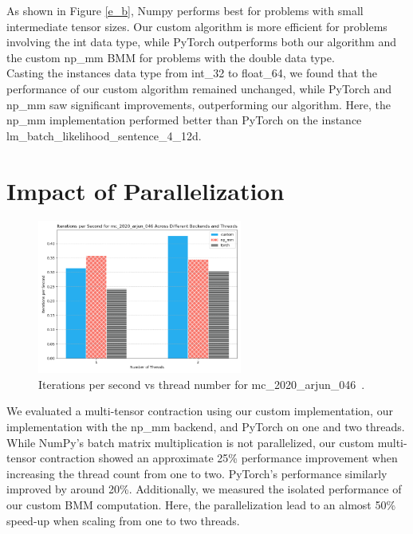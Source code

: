 \sloppy
\noindent As shown in Figure \ref{e_b}, Numpy performs best for problems with small intermediate tensor sizes. Our custom algorithm is more efficient for problems involving the int data type, while PyTorch outperforms both our algorithm and the custom np\_mm BMM for problems with the double data type.\\
Casting the instances data type from int\_32 to float\_64, we found that the performance of our custom algorithm remained unchanged, while PyTorch and np\_mm saw significant improvements, outperforming our algorithm. Here, the np\_mm implementation performed better than PyTorch on the instance lm\_batch\_likelihood\_sentence\_4\_12d.


\section{Impact of Parallelization}
\begin{figure}[H]
    \centering
    \includegraphics[width=0.6\textwidth]{images/threads.png}  %
    \caption{Iterations per second vs thread number for mc\_2020\_arjun\_046~\cite{blacher2024einsum}.}
    \label{threads}
\end{figure}
\noindent We evaluated a multi-tensor contraction using our custom implementation, our implementation with the np\_mm backend, and PyTorch on one and two threads. While NumPy’s batch matrix multiplication is not parallelized, our custom multi-tensor contraction showed an approximate 25\% performance improvement when increasing the thread count from one to two. PyTorch’s performance similarly improved by around 20\%. Additionally, we measured the isolated performance of our custom BMM computation. Here, the parallelization lead to an almost 50\% speed-up when scaling from one to two threads. 
